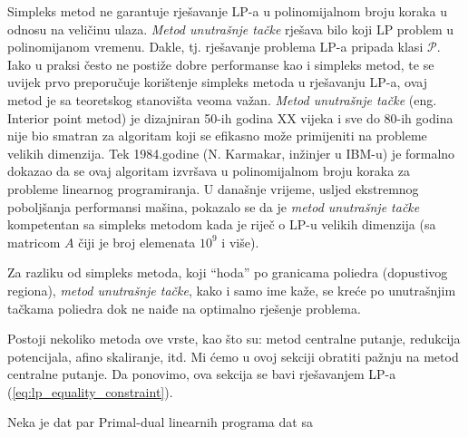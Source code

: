 \documentclass[a4paper, utf8, 11pt, colorlinks]{book}
\begin{document}
Simpleks metod ne garantuje   rješavanje LP-a u polinomijalnom broju koraka u odnosu na veličinu ulaza. %
\emph{Metod unutrašnje tačke} rješava bilo koji LP problem u polinomijanom vremenu. Dakle, tj. rješavanje problema LP-a pripada klasi $\mathcal{P}$. Iako u praksi često ne postiže dobre  performanse kao i simpleks metod, te se uvijek prvo preporučuje korištenje simpleks metoda u rješavanju LP-a, ovaj metod je sa teoretskog stanovišta veoma važan.  \emph{Metod unutrašnje tačke} (eng. Interior point metod) je dizajniran 50-ih godina XX vijeka i sve do 80-ih godina nije bio smatran za algoritam koji se efikasno može primijeniti na probleme velikih dimenzija. Tek 1984.godine (N. Karmakar, inžinjer u IBM-u) je formalno dokazao da se ovaj algoritam izvršava u polinomijalnom broju koraka za probleme linearnog programiranja. U današnje vrijeme, usljed ekstremnog poboljšanja performansi mašina, pokazalo se da je \emph{metod unutrašnje tačke} kompetentan sa simpleks metodom kada je riječ o LP-u velikih dimenzija (sa matricom $A$ čiji je broj elemenata $10^9$ i više).

Za razliku od simpleks metoda, koji ``hoda'' po granicama poliedra (dopustivog regiona), \emph{metod unutrašnje tačke}, kako i samo ime kaže, se kreće po unutrašnjim tačkama poliedra  dok ne naiđe na optimalno rješenje problema. 

Postoji nekoliko metoda ove vrste, kao što su: metod centralne putanje, redukcija potencijala, afino skaliranje, itd. Mi ćemo u ovoj sekciji obratiti pažnju na metod centralne putanje. Da ponovimo, ova sekcija se bavi rješavanjem LP-a (\ref{eq:lp_equality_constraint}). 

Neka je dat par Primal-dual linearnih programa dat sa
\end{document}
